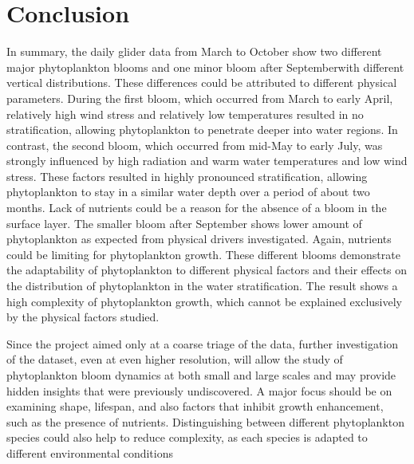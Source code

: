 \documentclass[../Main.tex]{subfiles}
\begin{document}
\section*{\crule[blue]{.3cm}{.3cm} Conclusion}
In summary, the daily glider data from March to October show two different major phytoplankton blooms and one minor bloom after Septemberwith different vertical distributions. These differences could be attributed to different physical parameters.
During the first bloom, which occurred from March to early April, relatively high wind stress and relatively low temperatures resulted in no stratification, allowing phytoplankton to penetrate deeper into water regions.
In contrast, the second bloom, which occurred from mid-May to early July, was strongly influenced by high radiation and warm water temperatures and low wind stress.
These factors resulted in highly pronounced stratification, allowing phytoplankton to stay in a similar water depth over a period of about two months.
Lack of nutrients could be a reason for the absence of a bloom in the surface layer.
The smaller bloom after September shows lower amount of phytoplankton as expected from physical drivers investigated.
Again, nutrients could be limiting for phytoplankton growth.
These different blooms demonstrate the adaptability of phytoplankton to different physical factors and their effects on the distribution of phytoplankton in the water stratification.
The result shows a high complexity of phytoplankton growth, which cannot be explained exclusively by the physical factors studied.

Since the project aimed only at a coarse triage of the data, further investigation of the dataset, even at even higher resolution, will allow the study of phytoplankton bloom dynamics at both small and large scales and may provide hidden insights that were previously undiscovered.
A major focus should be on examining shape, lifespan, and also factors that inhibit growth enhancement, such as the presence of nutrients.
Distinguishing between different phytoplankton species could also help to reduce complexity, as each species is adapted to different environmental conditions 
\end{document}
